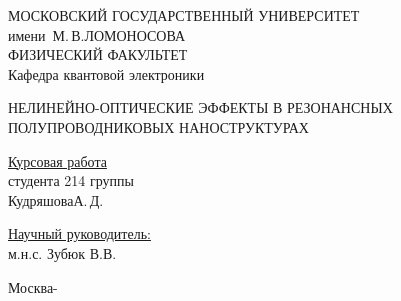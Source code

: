 \begin{titlepage}

\begin{center}
\large
МОСКОВСКИЙ ГОСУДАРСТВЕННЫЙ УНИВЕРСИТЕТ\\
имени~М.\,В.\;ЛОМОНОСОВА\\
ФИЗИЧЕСКИЙ ФАКУЛЬТЕТ\\
Кафедра квантовой электроники
\end{center}

\vfill

\begin{center}
\large
НЕЛИНЕЙНО-ОПТИЧЕСКИЕ ЭФФЕКТЫ В РЕЗОНАНСНЫХ ПОЛУПРОВОДНИКОВЫХ НАНОСТРУКТУРАХ
\end{center}

\vfill

\begin{flushright}
    \begin{minipage}{0.35\textwidth}
    \underline{Курсовая работа}\\
    студента 214 группы\\
    Кудряшова\;А.\,Д.
    \end{minipage}
\end{flushright}
\vspace*{6mm}
\begin{flushright}
    \begin{minipage}{0.35\textwidth}
    \underline{Научный руководитель:}\\
    м.н.с. Зубюк В.В.\\
    \end{minipage}
\end{flushright}

\vfill

\centerline{Москва\;-}

\end{titlepage}